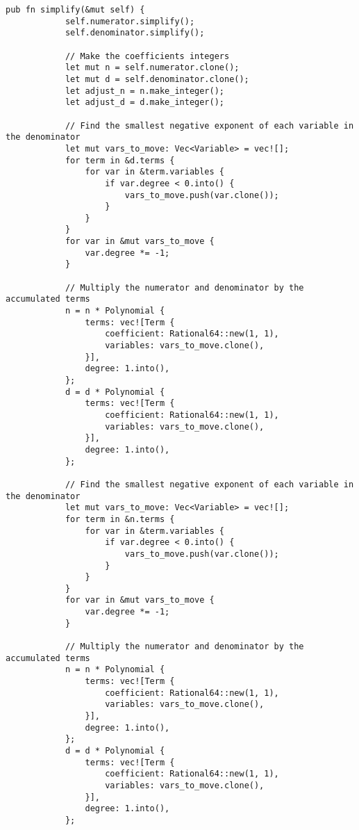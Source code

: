     \begin{lstlisting}[caption={The implementation of the \texttt{simplify()} method for the \texttt{PolyRatio} struct}, label={lst:polyratio-simplify}]
        pub fn simplify(&mut self) {
            self.numerator.simplify();
            self.denominator.simplify();

            // Make the coefficients integers
            let mut n = self.numerator.clone();
            let mut d = self.denominator.clone();
            let adjust_n = n.make_integer();
            let adjust_d = d.make_integer();
    
            // Find the smallest negative exponent of each variable in the denominator
            let mut vars_to_move: Vec<Variable> = vec![];
            for term in &d.terms {
                for var in &term.variables {
                    if var.degree < 0.into() {
                        vars_to_move.push(var.clone());
                    }
                }
            }
            for var in &mut vars_to_move {
                var.degree *= -1;
            }
    
            // Multiply the numerator and denominator by the accumulated terms
            n = n * Polynomial {
                terms: vec![Term {
                    coefficient: Rational64::new(1, 1),
                    variables: vars_to_move.clone(),
                }],
                degree: 1.into(),
            };
            d = d * Polynomial {
                terms: vec![Term {
                    coefficient: Rational64::new(1, 1),
                    variables: vars_to_move.clone(),
                }],
                degree: 1.into(),
            };
    
            // Find the smallest negative exponent of each variable in the denominator
            let mut vars_to_move: Vec<Variable> = vec![];
            for term in &n.terms {
                for var in &term.variables {
                    if var.degree < 0.into() {
                        vars_to_move.push(var.clone());
                    }
                }
            }
            for var in &mut vars_to_move {
                var.degree *= -1;
            }
    
            // Multiply the numerator and denominator by the accumulated terms
            n = n * Polynomial {
                terms: vec![Term {
                    coefficient: Rational64::new(1, 1),
                    variables: vars_to_move.clone(),
                }],
                degree: 1.into(),
            };
            d = d * Polynomial {
                terms: vec![Term {
                    coefficient: Rational64::new(1, 1),
                    variables: vars_to_move.clone(),
                }],
                degree: 1.into(),
            };
    

\end{lstlisting}
